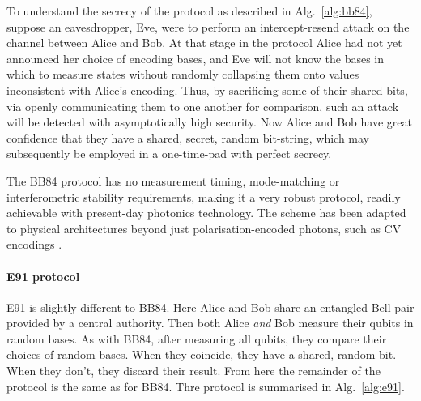To understand the secrecy of the protocol as described in Alg.~\ref{alg:bb84}, suppose an eavesdropper, Eve, were to perform an intercept-resend attack on the channel between Alice and Bob. At that stage in the protocol Alice had not yet announced her choice of encoding bases, and Eve will not know the bases in which to measure states without randomly collapsing them onto values inconsistent with Alice's encoding. Thus, by sacrificing some of their shared bits, via openly communicating them to one another for comparison, such an attack will be detected with asymptotically high security. Now Alice and Bob have great confidence that they have a shared, secret, random bit-string, which may subsequently be employed in a one-time-pad with perfect secrecy.

The BB84 protocol has no measurement timing, mode-matching or interferometric stability requirements, making it a very robust protocol, readily achievable with present-day photonics technology. The scheme has been adapted to physical architectures beyond just polarisation-encoded photons, such as CV encodings \cite{???}.

%
%

\paragraph{E91 protocol}

E91 is slightly different to BB84. Here Alice and Bob share an entangled Bell-pair provided by a central authority. Then both Alice \textit{and} Bob measure their qubits in random bases. As with BB84, after measuring all qubits, they compare their choices of random bases. When they coincide, they have a shared, random bit. When they don't, they discard their result. From here the remainder of the protocol is the same as for BB84. Thre protocol is summarised in Alg.~\ref{alg:e91}.

